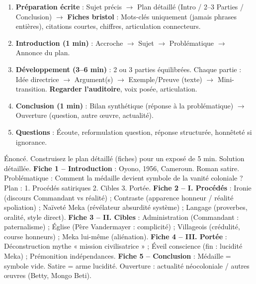 \documentclass[11pt]{article}
\begin{document}
\begin{methode}
\begin{enumerate}
\item \textbf{Préparation écrite} : Sujet précis $\rightarrow$ Plan détaillé (Intro / 2--3 Parties / Conclusion) $\rightarrow$ \textbf{Fiches bristol} : Mots-clés uniquement (jamais phrases entières), citations courtes, chiffres, articulation connecteurs.
\item \textbf{Introduction (1 min)} : Accroche $\rightarrow$ Sujet $\rightarrow$ Problématique $\rightarrow$ Annonce du plan.
\item \textbf{Développement (3--6 min)} : 2 ou 3 parties équilibrées. Chaque partie : Idée directrice $\rightarrow$ Argument(s) $\rightarrow$ Exemple/Preuve (texte) $\rightarrow$ Mini-transition. \textbf{Regarder l'auditoire}, voix posée, articulation.
\item \textbf{Conclusion (1 min)} : Bilan synthétique (réponse à la problématique) $\rightarrow$ Ouverture (question, autre œuvre, actualité).
\item \textbf{Questions} : Écoute, reformulation question, réponse structurée, honnêteté si ignorance.
\end{enumerate}
\end{methode}

\begin{exoresolu}
Énoncé. Construisez le plan détaillé (fiches) pour un exposé de 5 min.
\tcblower
Solution détaillée.
\textbf{Fiche 1 -- Introduction} : Oyono, 1956, Cameroun. Roman satire. Problématique : Comment la médaille devient symbole de la vanité coloniale ? Plan : 1. Procédés satiriques 2. Cibles 3. Portée.
\textbf{Fiche 2 -- I. Procédés} : Ironie (discours Commandant vs réalité) ; Contraste (apparence honneur / réalité spoliation) ; Naïveté Meka (révélateur absurdité système) ; Langage (proverbes, oralité, style direct).
\textbf{Fiche 3 -- II. Cibles} : Administration (Commandant : paternalisme) ; Église (Père Vandermayer : complicité) ; Villageois (crédulité, course honneurs) ; Meka lui-même (aliénation).
\textbf{Fiche 4 -- III. Portée} : Déconstruction mythe « mission civilisatrice » ; Éveil conscience (fin : lucidité Meka) ; Prémonition indépendances.
\textbf{Fiche 5 -- Conclusion} : Médaille = symbole vide. Satire = arme lucidité. Ouverture : actualité néocoloniale / autres œuvres (Betty, Mongo Beti).
\end{exoresolu}
\end{document}

